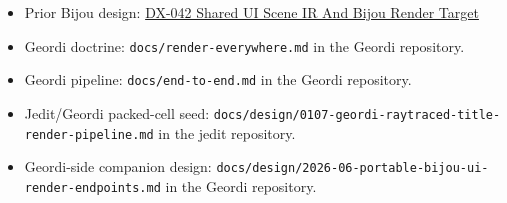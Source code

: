 \begin{itemize}
\tightlist
\item
  Prior Bijou design: \href{https://github.com/flyingrobots/bijou/blob/cbd70612140e7a450d764b3c7be1c6af878b99bc/docs/design/DX-042-shared-ui-scene-ir-and-bijou-render-target.md}{DX-042 Shared UI Scene IR And Bijou Render Target}
\item
  Geordi doctrine: \texttt{d\allowbreak{}o\allowbreak{}c\allowbreak{}s\allowbreak{}/\allowbreak{}r\allowbreak{}e\allowbreak{}n\allowbreak{}d\allowbreak{}e\allowbreak{}r\allowbreak{}-\allowbreak{}e\allowbreak{}v\allowbreak{}e\allowbreak{}r\allowbreak{}y\allowbreak{}w\allowbreak{}h\allowbreak{}e\allowbreak{}r\allowbreak{}e\allowbreak{}.\allowbreak{}m\allowbreak{}d} in the Geordi repository.
\item
  Geordi pipeline: \texttt{d\allowbreak{}o\allowbreak{}c\allowbreak{}s\allowbreak{}/\allowbreak{}e\allowbreak{}n\allowbreak{}d\allowbreak{}-\allowbreak{}t\allowbreak{}o\allowbreak{}-\allowbreak{}e\allowbreak{}n\allowbreak{}d\allowbreak{}.\allowbreak{}m\allowbreak{}d} in the Geordi repository.
\item
  Jedit/Geordi packed-cell seed: \texttt{d\allowbreak{}o\allowbreak{}c\allowbreak{}s\allowbreak{}/\allowbreak{}d\allowbreak{}e\allowbreak{}s\allowbreak{}i\allowbreak{}g\allowbreak{}n\allowbreak{}/\allowbreak{}0\allowbreak{}1\allowbreak{}0\allowbreak{}7\allowbreak{}-\allowbreak{}g\allowbreak{}e\allowbreak{}o\allowbreak{}r\allowbreak{}d\allowbreak{}i\allowbreak{}-\allowbreak{}r\allowbreak{}a\allowbreak{}y\allowbreak{}t\allowbreak{}r\allowbreak{}a\allowbreak{}c\allowbreak{}e\allowbreak{}d\allowbreak{}-\allowbreak{}t\allowbreak{}i\allowbreak{}t\allowbreak{}l\allowbreak{}e\allowbreak{}-\allowbreak{}r\allowbreak{}e\allowbreak{}n\allowbreak{}d\allowbreak{}e\allowbreak{}r\allowbreak{}-\allowbreak{}p\allowbreak{}i\allowbreak{}p\allowbreak{}e\allowbreak{}l\allowbreak{}i\allowbreak{}n\allowbreak{}e\allowbreak{}.\allowbreak{}m\allowbreak{}d} in the jedit repository.
\item
  Geordi-side companion design: \texttt{d\allowbreak{}o\allowbreak{}c\allowbreak{}s\allowbreak{}/\allowbreak{}d\allowbreak{}e\allowbreak{}s\allowbreak{}i\allowbreak{}g\allowbreak{}n\allowbreak{}/\allowbreak{}2\allowbreak{}0\allowbreak{}2\allowbreak{}6\allowbreak{}-\allowbreak{}0\allowbreak{}6\allowbreak{}-\allowbreak{}p\allowbreak{}o\allowbreak{}r\allowbreak{}t\allowbreak{}a\allowbreak{}b\allowbreak{}l\allowbreak{}e\allowbreak{}-\allowbreak{}b\allowbreak{}i\allowbreak{}j\allowbreak{}o\allowbreak{}u\allowbreak{}-\allowbreak{}u\allowbreak{}i\allowbreak{}-\allowbreak{}r\allowbreak{}e\allowbreak{}n\allowbreak{}d\allowbreak{}e\allowbreak{}r\allowbreak{}-\allowbreak{}e\allowbreak{}n\allowbreak{}d\allowbreak{}p\allowbreak{}o\allowbreak{}i\allowbreak{}n\allowbreak{}t\allowbreak{}s\allowbreak{}.\allowbreak{}m\allowbreak{}d} in the Geordi repository.
\end{itemize}

